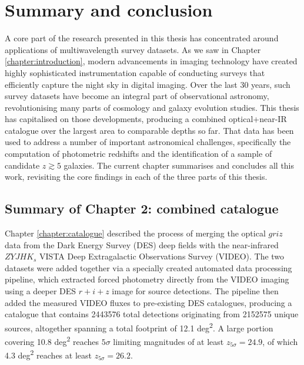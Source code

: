\chapter{Summary and conclusion}\label{chapter:conclusion}



\ifpdf
    \graphicspath{{Chapter5/Figs/Raster/}{Chapter5/Figs/PDF/}{Chapter5/Figs/}}
\else
    \graphicspath{{Chapter5/Figs/Vector/}{Chapter5/Figs/}}
\fi


A core part of the research presented in this thesis has concentrated around applications of multiwavelength survey datasets. As we saw in Chapter \ref{chapter:introduction}, modern advancements in imaging technology have created highly sophisticated instrumentation capable of conducting surveys that efficiently capture the night sky in digital imaging. Over the last 30 years, such survey datasets have become an integral part of observational astronomy, revolutionising many parts of cosmology and galaxy evolution studies. This thesis has capitalised on those developments, producing a combined optical+near-IR catalogue over the largest area to comparable depths so far. That data has been used to address a number of important astronomical challenges, specifically the computation of photometric redshifts and the identification of a sample of candidate $z\gtrsim5$ galaxies. The current chapter summarises and concludes all this work, revisiting the core findings in each of the three parts of this thesis. \par  



\section{Summary of Chapter 2: combined \DESVIDEO catalogue}
Chapter \ref{chapter:catalogue} described the process of merging the optical $griz$ data from the Dark Energy Survey (DES) deep fields with the near-infrared $ZYJHK_{s}$ VISTA Deep Extragalactic Observations Survey (VIDEO). The two datasets were added together via a specially created automated data processing pipeline, which extracted forced photometry directly from the VIDEO imaging using a deeper DES $r+i+z$ image for source detections. The pipeline then added the measured VIDEO fluxes to pre-existing DES catalogues, producing a catalogue that contains \num{2 443 576} total detections originating from \num{2 152 575} unique sources, altogether spanning a total footprint of 12.1 deg\textsuperscript{2}. A large portion covering 10.8 deg\textsuperscript{2} reaches $5\sigma$ limiting magnitudes of at least $z_{5\sigma}=24.9$, of which 4.3 deg\textsuperscript{2} reaches at least $z_{5\sigma}=26.2$. \par


